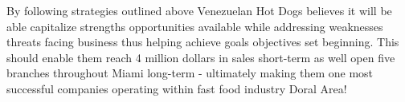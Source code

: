 By following strategies outlined above Venezuelan Hot Dogs believes it will be able capitalize strengths opportunities available while addressing weaknesses threats facing business thus helping achieve goals objectives set beginning. This should enable them reach 4 million dollars in sales short-term as well open five branches throughout Miami long-term - ultimately making them one most successful companies operating within fast food industry Doral Area!